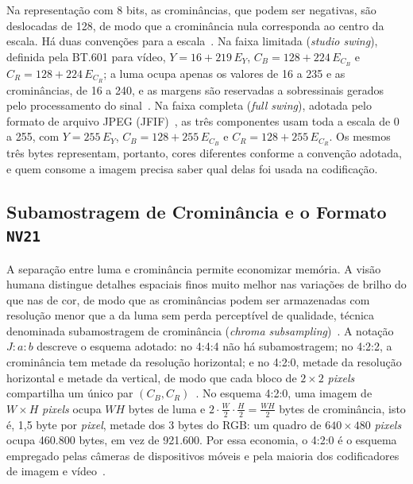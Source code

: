 Na representação com 8 bits, as crominâncias, que podem ser negativas, são deslocadas de 128, de modo que a crominância nula corresponda ao centro da escala. Há duas convenções para a escala~\cite{poynton2012digital}. Na faixa limitada (\textit{studio swing}), definida pela BT.601 para vídeo, $Y = 16 + 219\,E_Y$, $C_B = 128 + 224\,E_{C_B}$ e $C_R = 128 + 224\,E_{C_R}$; a luma ocupa apenas os valores de 16 a 235 e as crominâncias, de 16 a 240, e as margens são reservadas a sobressinais gerados pelo processamento do sinal~\cite{itu_bt601}. Na faixa completa (\textit{full swing}), adotada pelo formato de arquivo JPEG (JFIF)~\cite{itu_t871}, as três componentes usam toda a escala de 0 a 255, com $Y = 255\,E_Y$, $C_B = 128 + 255\,E_{C_B}$ e $C_R = 128 + 255\,E_{C_R}$. Os mesmos três bytes representam, portanto, cores diferentes conforme a convenção adotada, e quem consome a imagem precisa saber qual delas foi usada na codificação.

\subsection{Subamostragem de Crominância e o Formato \texttt{NV21}} \label{sec:nv21}

A separação entre luma e crominância permite economizar memória. A visão humana distingue detalhes espaciais finos muito melhor nas variações de brilho do que nas de cor, de modo que as crominâncias podem ser armazenadas com resolução menor que a da luma sem perda perceptível de qualidade, técnica denominada subamostragem de crominância (\textit{chroma subsampling})~\cite{poynton2012digital}. A notação $J{:}a{:}b$ descreve o esquema adotado: no 4:4:4 não há subamostragem; no 4:2:2, a crominância tem metade da resolução horizontal; e no 4:2:0, metade da resolução horizontal e metade da vertical, de modo que cada bloco de $2 \times 2$ \textit{pixels} compartilha um único par $(C_B, C_R)$~\cite{poynton2012digital}. No esquema 4:2:0, uma imagem de $W \times H$ \textit{pixels} ocupa $WH$ bytes de luma e $2 \cdot \frac{W}{2} \cdot \frac{H}{2} = \frac{WH}{2}$ bytes de crominância, isto é, 1,5 byte por \textit{pixel}, metade dos 3 bytes do RGB: um quadro de $640 \times 480$ \textit{pixels} ocupa 460.800 bytes, em vez de 921.600. Por essa economia, o 4:2:0 é o esquema empregado pelas câmeras de dispositivos móveis e pela maioria dos codificadores de imagem e vídeo~\cite{poynton2012digital}.

